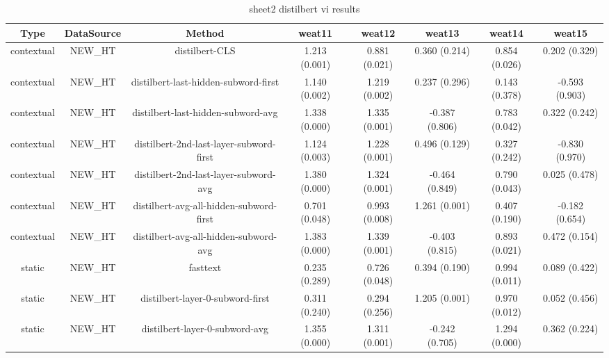 \begin{sidewaystable}[htb]
    \centering
    \caption{sheet2 distilbert vi results}
    \label{appendix_tab:sheet2_distilbert_vi_results}
    \small
    \begin{tabular}{@{}cccccccc@{}}
        \toprule
        Type & DataSource & Method & weat11 & weat12 & weat13 & weat14 & weat15 \\
        \midrule
        contextual & NEW\_HT & distilbert-CLS & 1.213 (0.001) & 0.881 (0.021) & 0.360 (0.214) & 0.854 (0.026) & 0.202 (0.329) \\
        contextual & NEW\_HT & distilbert-last-hidden-subword-first & 1.140 (0.002) & 1.219 (0.002) & 0.237 (0.296) & 0.143 (0.378) & -0.593 (0.903) \\
        contextual & NEW\_HT & distilbert-last-hidden-subword-avg & 1.338 (0.000) & 1.335 (0.001) & -0.387 (0.806) & 0.783 (0.042) & 0.322 (0.242) \\
        contextual & NEW\_HT & distilbert-2nd-last-layer-subword-first & 1.124 (0.003) & 1.228 (0.001) & 0.496 (0.129) & 0.327 (0.242) & -0.830 (0.970) \\
        contextual & NEW\_HT & distilbert-2nd-last-layer-subword-avg & 1.380 (0.000) & 1.324 (0.001) & -0.464 (0.849) & 0.790 (0.043) & 0.025 (0.478) \\
        contextual & NEW\_HT & distilbert-avg-all-hidden-subword-first & 0.701 (0.048) & 0.993 (0.008) & 1.261 (0.001) & 0.407 (0.190) & -0.182 (0.654) \\
        contextual & NEW\_HT & distilbert-avg-all-hidden-subword-avg & 1.383 (0.000) & 1.339 (0.001) & -0.403 (0.815) & 0.893 (0.021) & 0.472 (0.154) \\
        static & NEW\_HT & fasttext & 0.235 (0.289) & 0.726 (0.048) & 0.394 (0.190) & 0.994 (0.011) & 0.089 (0.422) \\
        static & NEW\_HT & distilbert-layer-0-subword-first & 0.311 (0.240) & 0.294 (0.256) & 1.205 (0.001) & 0.970 (0.012) & 0.052 (0.456) \\
        static & NEW\_HT & distilbert-layer-0-subword-avg & 1.355 (0.000) & 1.311 (0.001) & -0.242 (0.705) & 1.294 (0.000) & 0.362 (0.224) \\
        \bottomrule
    \end{tabular}
\end{sidewaystable}